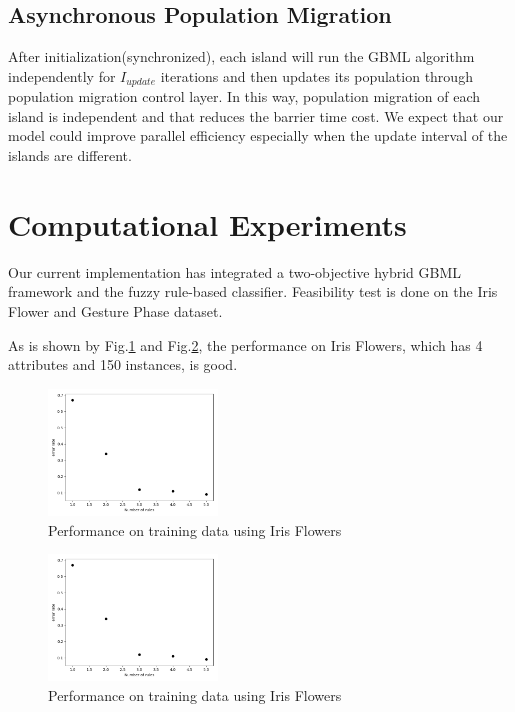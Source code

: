 \documentclass[conference]{IEEEtran}
\begin{document}
  \subsection{Asynchronous Population Migration}
  After initialization(synchronized), each island will run the GBML algorithm independently for $I_{update}$ iterations and then updates its population through population migration control layer. In this way, population migration of each island is independent and that reduces the barrier time cost. We expect that our model could improve parallel efficiency especially when the update interval of the islands are different. 
  
  
  \section{Computational Experiments}

	 Our current implementation has integrated a two-objective hybrid GBML framework and the fuzzy rule-based classifier. Feasibility test is done on the Iris Flower\cite{Iris} and Gesture Phase dataset\cite{Gphase}. 

   As is shown by Fig.\ref{irisTr} and Fig.\ref{irisT}, the performance on Iris Flowers, which has 4 attributes and 150 instances, is good.
 \begin{figure}[H]
 	\centering
 	\includegraphics[width=0.4\textwidth]{figures/iris.png}
 	\caption{Performance on training data using Iris Flowers}\label{irisTr}
 \end{figure}
 \begin{figure}[H]
 	\centering
 	\includegraphics[width=0.4\textwidth]{figures/iris.png}
 	\caption{Performance on training data using Iris Flowers}\label{irisT}
 \end{figure}
 
\end{document}
